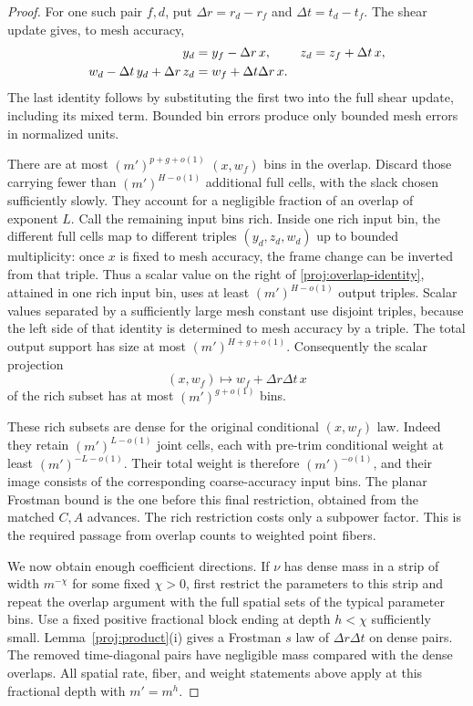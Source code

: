 \begin{proof}
For one such pair $f,d$, put
$\Delta r=r_d-r_f$ and $\Delta t=t_d-t_f$. The shear update
gives, to mesh accuracy,
\begin{align}
 y_d&=y_f-\Delta r\,x,
 &z_d&=z_f+\Delta t\,x,
 \notag\\
 w_d-\Delta t\,y_d+\Delta r\,z_d
     &=w_f+\Delta t\Delta r\,x.
 \label{proj:overlap-identity}
\end{align}
The last identity follows by substituting the first two into
the full shear update, including its mixed term. Bounded bin
errors produce only bounded mesh errors in normalized units.

There are at most $(m')^{p+g+o(1)}$ $(x,w_f)$ bins in the
overlap. Discard those carrying fewer than
$(m')^{H-o(1)}$ additional full cells, with the slack chosen
sufficiently slowly. They account for a negligible fraction
of an overlap of exponent $L$. Call the remaining input bins
rich. Inside one rich input bin, the different full cells map
to different triples $(y_d,z_d,w_d)$ up to bounded
multiplicity: once $x$ is fixed to mesh accuracy, the frame
change can be inverted from that triple. Thus a scalar value
on the right of \eqref{proj:overlap-identity}, attained in
one rich input bin, uses at least $(m')^{H-o(1)}$ output
triples. Scalar values separated by a sufficiently large
mesh constant use disjoint triples, because the left side
of that identity is determined to mesh accuracy by a triple.
The total output support has size at most
$(m')^{H+g+o(1)}$. Consequently the scalar projection
\[
 (x,w_f)\longmapsto w_f+\Delta r\Delta t\,x
\]
of the rich subset has at most $(m')^{g+o(1)}$ bins.

These rich subsets are dense for the original conditional
$(x,w_f)$ law. Indeed they retain $(m')^{L-o(1)}$ joint cells,
each with pre-trim conditional weight at least
$(m')^{-L-o(1)}$. Their total weight is therefore
$(m')^{-o(1)}$, and their image consists of the corresponding
coarse-accuracy input bins. The planar Frostman bound is the
one before this final restriction, obtained from the matched
$C,A$ advances. The rich restriction costs only a subpower
factor. This is the required passage from overlap counts to
weighted point fibers.

We now obtain enough coefficient directions. If $\nu$ has
dense mass in a strip of width $m^{-\chi}$ for some fixed
$\chi>0$, first restrict the parameters to this strip and
repeat the overlap argument with the full spatial sets of
the typical parameter bins. Use a fixed positive fractional
block ending at depth $h<\chi$ sufficiently small.
Lemma~\ref{proj:product}(i) gives a Frostman $s$ law of
$\Delta r\Delta t$ on dense pairs. The removed time-diagonal
pairs have negligible mass compared with the dense overlaps.
All spatial rate, fiber, and weight statements above apply
at this fractional depth with $m'=m^h$.


\end{proof}
